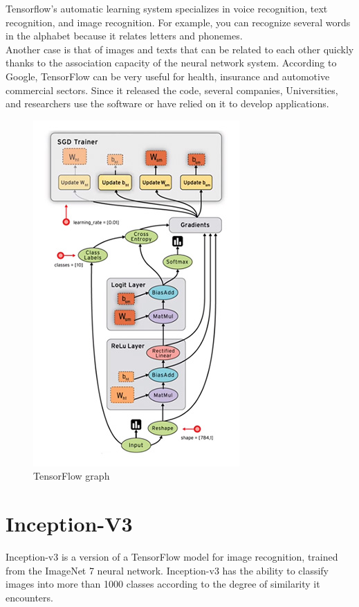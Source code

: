 Tensorflow's  automatic learning system specializes in voice recognition, text recognition, and image recognition. For example, you can recognize several words in the alphabet because it relates letters and phonemes. \\ Another case is that of images and texts that can be related to each other quickly thanks to the association capacity of the neural network system. According to Google, TensorFlow can be very useful for health, insurance and automotive commercial sectors. Since it released the code, several companies, Universities, and researchers use the software or have relied on it to develop applications.

\begin{figure}[h]
\centering
\includegraphics[scale=0.5]{figures/TensorFlow-graph.jpg}
\caption{TensorFlow graph}
\label{TensorFlow-graph}
\end{figure}

\section{Inception-V3}

Inception-v3 is a version of a TensorFlow model for image recognition, trained from the ImageNet 7 neural network. Inception-v3 has the ability to classify images into more than 1000 classes according to the degree of similarity it encounters.

